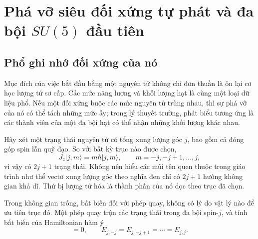 \chapter{Phá vỡ siêu đối xứng tự phát và đa bội \texorpdfstring{\(SU(5)\)}{SU(5)} đầu tiên}


\section{Phổ ghi nhớ đối xứng của nó}

Mục đích của việc bắt đầu bằng một nguyên tử không chỉ đơn thuần là ôn lại cơ học lượng tử sơ cấp. Các mức năng lượng và khối lượng hạt là cùng một loại dữ liệu phổ. Nếu một đối xứng buộc các mức nguyên tử trùng nhau, thì sự phá vỡ của nó có thể tách những mức ấy; trong lý thuyết trường, phát biểu tương ứng là các thành viên của một đa bội hạt có thể nhận những khối lượng khác nhau.

Hãy xét một trạng thái nguyên tử có tổng xung lượng góc \(j\), bao gồm cả đóng góp spin lẫn quỹ đạo. So với bất kỳ trục nào được chọn,
\begin{equation}
J_z|j,m\rangle=m\hbar|j,m\rangle,
\qquad
m=-j,-j+1,\ldots,j,
\end{equation}
vì vậy có \(2j+1\) trạng thái. Không nên hiểu các mũi tên quen thuộc trong giáo trình như thể vectơ xung lượng góc theo nghĩa đen chỉ có \(2j+1\) hướng không gian khả dĩ. Thứ bị lượng tử hóa là thành phần của nó dọc theo trục đã chọn.

Trong không gian trống, bất biến đối với phép quay, không có lý do vật lý nào để ưu tiên trục đó. Một phép quay trộn các trạng thái trong đa bội spin-\(j\), và tính bất biến của Hamiltonian hàm ý
\begin{equation}
[H,\mathbf J]=0,
\qquad
E_{j,-j}=E_{j,-j+1}=\cdots=E_{j,j}.
\label{eq:l9-degeneracy}
\end{equation}

